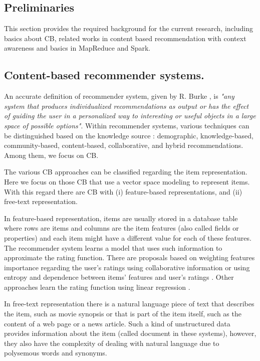\documentclass[preprint]{elsarticle}
\begin{document}
\begin{spacing}{1.5}
\section{Preliminaries}
\label{sec:preliminaries}

This section provides the required background for the current research, including basics about CB, related works in content based recommendation with context awareness and basics in MapReduce and Spark.

\subsection{Content-based recommender systems.}

An accurate definition of recommender system, given by R. Burke \cite{Burke2002}, is \emph{"any system that produces individualized recommendations as output or has the effect of guiding the user in a personalized way to interesting or useful objects in a large space of possible options"}. Within recommender systems, various techniques can be distinguished based on the knowledge source \cite{DePessemier2016}: demographic, knowledge-based, community-based, content-based, collaborative, and hybrid recommendations. Among them, we focus on CB.

The various CB approaches can be classified regarding the item representation. Here we focus on those CB that use a vector space modeling to represent items. With this regard there are CB with (i) feature-based representations, and (ii) free-text representation.

In feature-based representation, items are usually stored in a database table where rows are items and columns are the item features (also called fields or properties) and each item might have a different value for each of these features. The recommender system learns a model that uses such information to approximate the rating function. There are proposals based on weighting features importance regarding the user's ratings using collaborative information \cite{Symeonidis2007} or using entropy and dependence between items' features and user's ratings \cite{Castro2014}. Other approaches learn the rating function using linear regression \cite{DePessemier2016}.

In free-text representation there is a natural language piece of text that describes the item, such as movie synopsis or that is part of the item itself, such as the content of a web page or a news article. Such a kind of unstructured data provides information about the item (called document in these systems), however, they also have the complexity of dealing with natural language due to polysemous words and synonyms.


\end{spacing}
\end{document}
